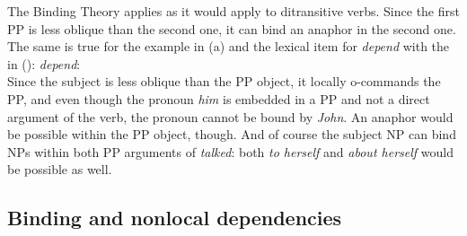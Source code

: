 \documentclass[output=paper,biblatex,babelshorthands,newtxmath,draftmode,colorlinks,citecolor=brown]{langscibook}
\begin{document}
\z
The Binding Theory applies as it would apply to ditransitive verbs. Since the first PP is less
oblique than the second one, it can bind an anaphor in the second one. The same is true for the
example in (a) and the lexical item for \emph{depend} with the \argst in ():
\ea
\emph{depend}:\\
\argst {}
\z
Since the subject is less oblique than the PP object, it locally o-commands
the PP, and even though the pronoun \emph{him} is embedded in a PP and not a direct argument of the verb,
the pronoun cannot be bound by \emph{John}. An anaphor would be possible within the PP object, though.
And of course the subject NP can bind NPs within both PP arguments of \emph{talked}: both \emph{to herself} and \emph{about
  herself} would be possible as well.\label{binding:page-prepositional-objects-end}


\subsection{Binding and nonlocal dependencies}




\end{document}
